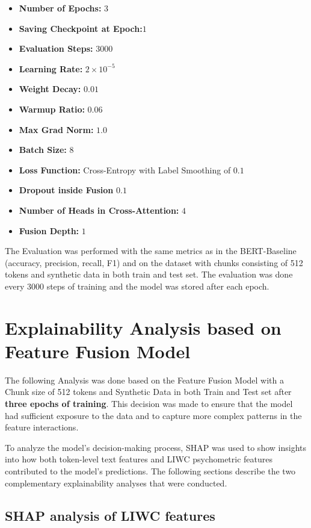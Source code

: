 \begin{itemize}
\item \textbf{Number of Epochs:} \(3\) 
\item \textbf{Saving Checkpoint at Epoch:}\(1\) 
\item \textbf{Evaluation Steps:} \(3000\)
\item \textbf{Learning Rate:} \(2\times10^{-5}\)
\item \textbf{Weight Decay:} \(0.01\)
\item \textbf{Warmup Ratio:} \(0.06\)
\item \textbf{Max Grad Norm:} \(1.0\)
\item \textbf{Batch Size:} \(8\)
\item \textbf{Loss Function:} Cross-Entropy with Label Smoothing of \(0.1\)
\item \textbf{Dropout inside Fusion} \(0.1\)
\item \textbf{Number of Heads in Cross-Attention:} \(4\)
\item \textbf{Fusion Depth:} \(1\)
\end{itemize}

The Evaluation was performed with the same metrics as in the BERT-Baseline (accuracy, precision, recall, F1) and on the dataset with chunks consisting of 512 tokens and synthetic data in both train and test set. The evaluation was done every 3000 steps of training and the model was stored after each epoch.




\section{Explainability Analysis based on Feature Fusion Model}

The following Analysis was done based on the Feature Fusion Model with a Chunk size of 512 tokens and Synthetic Data in both Train and Test set after \textbf{three epochs of training}. This decision was made to ensure that the model had sufficient exposure to the data and to capture more complex patterns in the feature interactions.

To analyze the model's decision-making process, SHAP was used to show insights into how both token-level text features and LIWC psychometric features contributed to the model's predictions. The following sections describe the two complementary explainability analyses that were conducted.


\subsection{SHAP analysis of LIWC features} \label{sec:shap_analysis_of_liwc_features}

